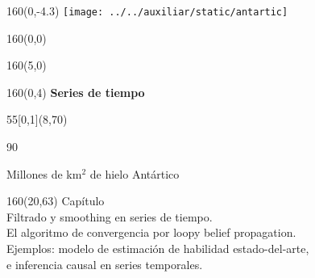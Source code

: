 \documentclass[shownotes,aspectratio=169]{beamer}
\newcounter{capitulo}
\newcommand{\unidad}{\thecapitulo \stepcounter{capitulo}}
\begin{document}
\begin{frame}
\begin{textblock}{160}(0,-4.3) \centering
\texttt{[image: ../../auxiliar/static/antartic]}
\end{textblock}

\begin{textblock}{160}(0,0) \centering
{}
\end{textblock}

\begin{textblock}{160}(5,0)
\end{textblock}


\begin{textblock}{160}(0,4) \centering
\LARGE \hspace{1cm} \textcolor{black!20}{\fontsize{22}{0}\selectfont \textbf{Series de tiempo}}
\end{textblock}


\begin{textblock}{55}[0,1](8,70)
\begin{turn}{90}
\parbox{6cm}{\footnotesize
\textcolor{black!10}{Millones de km$^2$ de hielo Antártico}}
\end{turn}
\end{textblock}


\begin{textblock}{160}(20,63)
\textcolor{black!10}{Capítulo \unidad \\ \small
Filtrado y smoothing en series de tiempo.\\
El algoritmo de convergencia por loopy belief propagation. \\
Ejemplos: modelo de estimación de habilidad estado-del-arte, \\
e inferencia causal en series temporales. \\
}
\end{textblock}


\end{frame}
%
\end{document}
